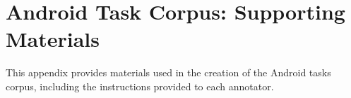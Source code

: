 \chapter{Android Task Corpus: Supporting Materials}


This appendix provides materials used in the creation of the Android tasks corpus, including the 
 instructions provided to each annotator.






